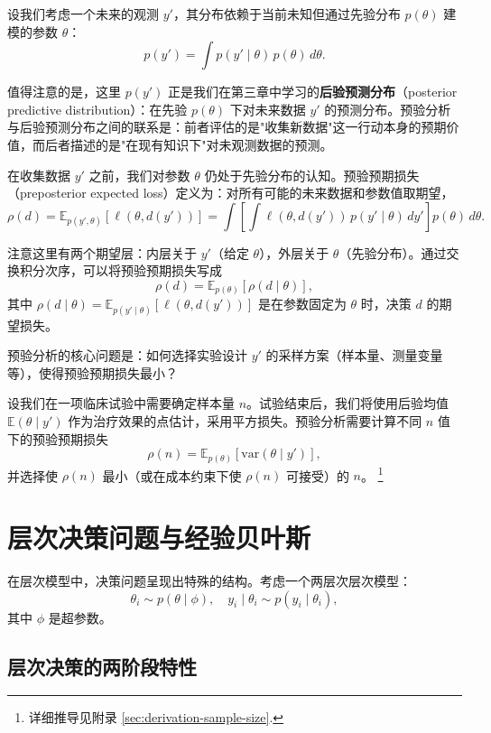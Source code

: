设我们考虑一个未来的观测 $y'$，其分布依赖于当前未知但通过先验分布 $p(\theta)$ 建模的参数 $\theta$：
\[
p(y') = \int p(y' \mid \theta) \, p(\theta) \, d\theta.
\]

值得注意的是，这里 $p(y')$ 正是我们在第三章中学习的\textbf{后验预测分布}（posterior predictive distribution）：在先验 $p(\theta)$ 下对未来数据 $y'$ 的预测分布。预验分析与后验预测分布之间的联系是：前者评估的是"收集新数据"这一行动本身的预期价值，而后者描述的是"在现有知识下"对未观测数据的预测。

在收集数据 $y'$ 之前，我们对参数 $\theta$ 仍处于先验分布的认知。预验预期损失（preposterior expected loss）定义为：对所有可能的未来数据和参数值取期望，
\[
\rho(d) = \mathbb{E}_{p(y', \theta)}[\ell(\theta, d(y'))] = \int \left[ \int \ell(\theta, d(y')) \, p(y' \mid \theta) \, dy' \right] p(\theta) \, d\theta.
\]

注意这里有两个期望层：内层关于 $y'$（给定 $\theta$），外层关于 $\theta$（先验分布）。通过交换积分次序，可以将预验预期损失写成
\[
\rho(d) = \mathbb{E}_{p(\theta)}[\rho(d \mid \theta)],
\]
其中 $\rho(d \mid \theta) = \mathbb{E}_{p(y'\mid\theta)}[\ell(\theta, d(y'))]$ 是在参数固定为 $\theta$ 时，决策 $d$ 的期望损失。

预验分析的核心问题是：如何选择实验设计 $y'$ 的采样方案（样本量、测量变量等），使得预验预期损失最小？

\begin{Example}[样本量确定]\label{ex:sample-size}
  设我们在一项临床试验中需要确定样本量 $n$。试验结束后，我们将使用后验均值 $\mathbb{E}(\theta \mid y')$ 作为治疗效果的点估计，采用平方损失。预验分析需要计算不同 $n$ 值下的预验预期损失
  \[
  \rho(n) = \mathbb{E}_{p(\theta)}[\text{var}(\theta \mid y')],
  \]
  并选择使 $\rho(n)$ 最小（或在成本约束下使 $\rho(n)$ 可接受）的 $n$。
  \footnote{详细推导见附录 \cref{sec:derivation-sample-size}.}
\end{Example}

\section{层次决策问题与经验贝叶斯}

在层次模型中，决策问题呈现出特殊的结构。考虑一个两层次层次模型：
\[
\theta_i \sim p(\theta \mid \phi), \quad y_i \mid \theta_i \sim p(y_i \mid \theta_i),
\]
其中 $\phi$ 是超参数。

\subsection{层次决策的两阶段特性}

